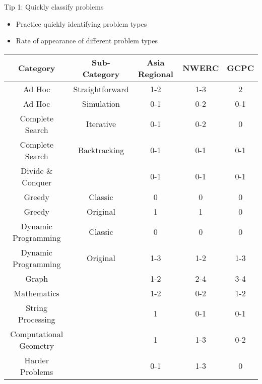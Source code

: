 \documentclass[12pt,t]{beamer}
\newcommand{\bi}{\begin{itemize}}
\newcommand{\ei}{\end{itemize}}
\begin{document}
\begin{frame}{Tip 1: Quickly classify problems}
    \bi
        \item Practice quickly identifying problem types
        \vspace{10pt}
        \item Rate of appearance of different problem types
    \ei

    \vspace{5pt}

{
    \scriptsize
        \begin{center}
            \begin{tabular}{ccccc}
                Category & Sub-Category & Asia Regional & NWERC & GCPC \\
                \hline
                Ad Hoc & Straightforward & 1-2 & 1-3 & 2\\
                Ad Hoc & Simulation & 0-1 & 0-2 & 0-1\\
                Complete Search & Iterative & 0-1 & 0-2 & 0\\
                Complete Search & Backtracking & 0-1 & 0-1 & 0-1\\
                Divide \&{} Conquer & & 0-1 & 0-1 & 0-1\\
                Greedy & Classic & 0 & 0 & 0\\
                Greedy & Original & 1 & 1 & 0\\
                Dynamic Programming & Classic & 0 & 0 & 0\\
                Dynamic Programming & Original & 1-3 & 1-2 & 1-3\\
                Graph &  & 1-2 & 2-4 & 3-4\\
                Mathematics &  & 1-2 & 0-2 & 1-2\\
                String Processing &  & 1 & 0-1 & 0-1\\
                Computational Geometry &  & 1 & 1-3 & 0-2\\
                Harder Problems &  & 0-1 & 1-3 & 0\\
            \end{tabular}
        \end{center}
}
\end{frame}
\end{document}
